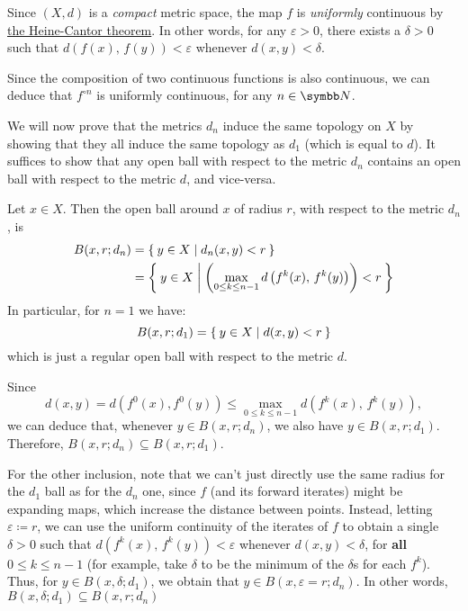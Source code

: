\begin{problem}
Since \(\left(X, d\right)\) is a \emph{compact} metric space, the map \(f\) is \emph{uniformly} continuous by \href{https://en.wikipedia.org/wiki/Heine\%E2\%80\%93Cantor_theorem}{the Heine-Cantor theorem}. In other words, for any \(\varepsilon > 0\), there exists a \(\delta > 0\) such that \(d(f(x), \, f(y)) < \varepsilon\) whenever \(d(x, y) < \delta\).

Since the composition of two continuous functions is also continuous, we can deduce that \(f^{\circ n}\) is uniformly continuous, for any \(n \in \naturals\).

We will now prove that the metrics \(d_n\) induce the same topology on \(X\) by showing that they all induce the same topology as \(d_1\) (which is equal to \(d\)). It suffices to show that any open ball with respect to the metric \(d_n\) contains an open ball with respect to the metric \(d\), and vice-versa.

Let \(x \in X\). Then the open ball around \(x\) of radius \(r\), with respect to the metric \(d_n\), is
\begin{align*}
    B(x, r; d_n) &= \Set{ y \in X | d_n(x, y) < r } \\
    &= \Set{ y \in X | \left(\max_{0 \leq k \leq n-1} d\left(f^k(x), \, f^k(y)\right)\right) < r }
\end{align*}
In particular, for \(n = 1\) we have:
\[
    B(x, r; d_1) = \Set{ y \in X | d(x, y) < r }
\]
which is just a regular open ball with respect to the metric \(d\).

Since
\[
    d(x, y) = d\left(f^0(x), f^0(y)\right) \leq \max_{0 \leq k \leq n-1} d\left(f^k(x), \, f^k(y)\right),
\]
we can deduce that, whenever \(y \in B(x, r; d_n)\), we also have \(y \in B(x, r; d_1)\). Therefore, \(B(x, r; d_n) \subseteq B(x, r; d_1)\).

For the other inclusion, note that we can't just directly use the same radius for the \(d_1\) ball as for the \(d_n\) one, since \(f\) (and its forward iterates) might be expanding maps, which increase the distance between points. Instead, letting \(\varepsilon \coloneq r\), we can use the uniform continuity of the iterates of \(f\) to obtain a single \(\delta > 0\) such that \(d\left(f^k(x), \, f^k(y)\right) < \varepsilon\) whenever \(d(x, y) < \delta\), for \textbf{all} \(0 \leq k \leq n - 1\) (for example, take \(\delta\) to be the minimum of the \(\delta\)s for each \(f^k\)). Thus, for \(y \in B(x, \delta; d_1)\), we obtain that \(y \in B(x, \varepsilon = r; d_n)\). In other words, \(B(x, \delta; d_1) \subseteq B(x, r; d_n)\)
\end{problem}
